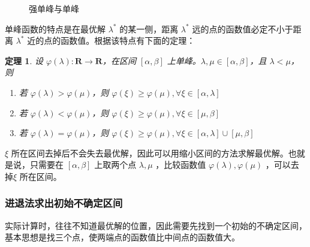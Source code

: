 \documentclass{book}
\newtheorem{theorem}{定理}[chapter]
\begin{document}
\begin{figure}[ht]
    \centering
    
    \caption{强单峰与单峰}
    \label{fig:stronglyUnimodalAndUnimodal}
\end{figure}

单峰函数的特点是在最优解 $\lambda^*$ 的某一侧，距离 $\lambda^*$ 远的点的函数值必定不小于距离 $\lambda^*$ 近的点的函数值。根据该特点有下面的定理：

\begin{theorem}
    设 $\varphi(\lambda):\mathbf{R}\rightarrow\mathbf{R}$，在区间 $[\alpha,\beta]$ 上单峰。$\lambda, \mu\in [\alpha,\beta]$，且 $\lambda<\mu$，则
    \begin{enumerate}
        \item 若 $\varphi(\lambda)>\varphi(\mu)$，则 $\varphi(\xi)\ge\varphi(\mu),\forall \xi\in[\alpha,\lambda]$
        \item 若 $\varphi(\lambda)<\varphi(\mu)$，则 $\varphi(\xi)\ge\varphi(\mu),\forall \xi\in[\mu,\beta]$
        \item 若 $\varphi(\lambda)=\varphi(\mu)$，则 $\varphi(\xi)\ge\varphi(\mu),\forall \xi\in[\alpha,\lambda]\cup[\mu,\beta]$
    \end{enumerate}
\end{theorem}

$\xi$ 所在区间去掉后不会失去最优解，因此可以用缩小区间的方法求解最优解。也就是说，只需要在 $[\alpha,\beta]$ 上取两个点 $\lambda,\mu$ ，比较函数值 $\varphi(\lambda),\varphi(\mu)$ ，可以去掉$\xi$ 所在区间。

\subsubsection{进退法求出初始不确定区间}

实际计算时，往往不知道最优解的位置，因此需要先找到一个初始的不确定区间，基本思想是找三个点，使两端点的函数值比中间点的函数值大。
\end{document}
